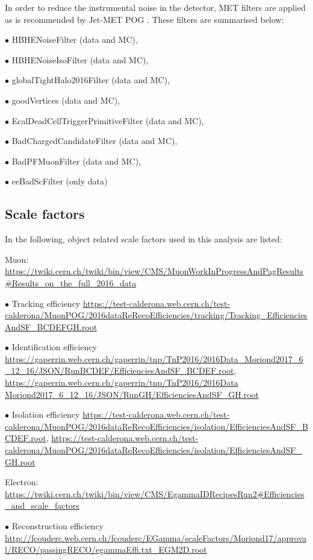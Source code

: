 In order to reduce the instrumental noise in the detector, MET filters are applied as is recommended by Jet-MET POG \cite{metfilter}.
These filters are summarised below:

$\bullet$ HBHENoiseFilter (data and MC),

$\bullet$ HBHENoiseIsoFilter (data and MC),

$\bullet$ globalTightHalo2016Filter (data and MC),

$\bullet$ goodVertices (data and MC),

$\bullet$ EcalDeadCellTriggerPrimitiveFilter (data and MC),

$\bullet$ BadChargedCandidateFilter (data and MC),

$\bullet$ BadPFMuonFilter (data and MC),

$\bullet$ eeBadScFilter (only data)

\subsection{Scale factors}

In the following, object related scale factors used in this analysis are listed:
\medskip

Muon: {\small\url{https://twiki.cern.ch/twiki/bin/view/CMS/MuonWorkInProgressAndPagResults#Results\_on\_the\_full\_2016\_data}}

$\bullet$ Tracking efficiency
{\small\url{https://test-calderona.web.cern.ch/test-calderona/MuonPOG/2016dataReRecoEfficiencies/tracking/Tracking\_EfficienciesAndSF\_BCDEFGH.root}}

$\bullet$ Identification efficiency
{\small\url{https://gaperrin.web.cern.ch/gaperrin/tnp/TnP2016/2016Data\_Moriond2017\_6\_12\_16/JSON/RunBCDEF/EfficienciesAndSF\_BCDEF.root}},
{\small\url{https://gaperrin.web.cern.ch/gaperrin/tnp/TnP2016/2016Data Moriond2017\_6\_12\_16/JSON/RunGH/EfficienciesAndSF\_GH.root}}

$\bullet$ Isolation efficiency
{\small\url{https://test-calderona.web.cern.ch/test-calderona/MuonPOG/2016dataReRecoEfficiencies/isolation/EfficienciesAndSF\_BCDEF.root}},
{\small\url{https://test-calderona.web.cern.ch/test-calderona/MuonPOG/2016dataReRecoEfficiencies/isolation/EfficienciesAndSF\_GH.root}}
\medskip

Electron: {\small\url{https://twiki.cern.ch/twiki/bin/view/CMS/EgammaIDRecipesRun2#Efficiencies\_and\_scale\_factors}}

$\bullet$ Reconstruction efficiency
{\small\url{http://fcouderc.web.cern.ch/fcouderc/EGamma/scaleFactors/Moriond17/approval/RECO/passingRECO/egammaEffi.txt\_EGM2D.root}}

